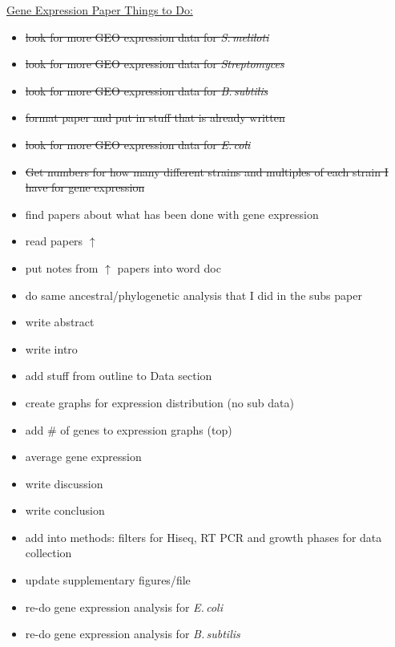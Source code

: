 \documentclass[12pt]{article}
\newcommand{\smel}{\textit{S.\,meliloti}\xspace}
\newcommand{\strep}{\textit{Streptomyces}\xspace}
\newcommand{\bass}{\textit{B.\,subtilis}\xspace}
\newcommand{\ecol}{\textit{E.\,coli}\xspace}
\begin{document}
\underline{Gene Expression Paper Things to Do:}
\begin{itemize}
	
	\item \sout{look for more GEO expression data for \smel}
	
	\item \sout{look for more GEO expression data for \strep}
	
	\item \sout{look for more GEO expression data for \bass}
	
	\item \sout{format paper and put in stuff that is already written}
	
	\item \sout{look for more GEO expression data for \ecol}
	
	\item \sout{Get numbers for how many different strains and multiples of each strain I have for gene expression}
	
	\item find papers about what has been done with gene expression
	
	\item read papers $\uparrow$
	
	\item put notes from $\uparrow$ papers into word doc
	
	\item do same ancestral/phylogenetic analysis that I did in the subs paper 
	
	\item write abstract
	
	\item write intro
	
	\item add stuff from outline to Data section
	
	\item create graphs for expression distribution (no sub data)
	
	\item add \# of genes to expression graphs (top)
	
	\item average gene expression
	
	\item write discussion
	
	\item write conclusion
	
	\item add into methods: filters for Hiseq, RT PCR and growth phases for data collection
	
	\item update supplementary figures/file
	
	\item re-do gene expression analysis for \ecol
	
	\item re-do gene expression analysis for \bass
	
\end{itemize}
\end{document}
